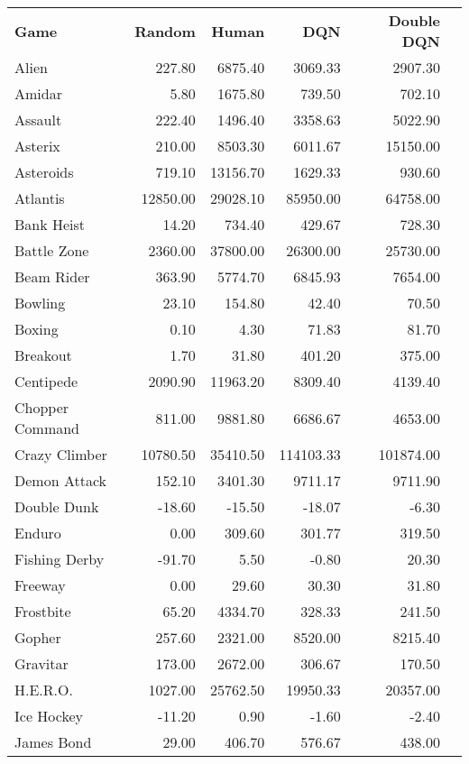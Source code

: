 \documentclass[letterpaper]{article}
\begin{document}
\begin{table*}[h]
\centering
\begin{tabular}{lrrrrr}
\textbf{Game} & \textbf{Random} & \textbf{Human} & \textbf{DQN} & \textbf{Double DQN} \\
Alien & 227.80 & 6875.40 & 3069.33 & 2907.30 \\
Amidar & 5.80 & 1675.80 & 739.50 & 702.10 \\
Assault & 222.40 & 1496.40 & 3358.63 & 5022.90 \\
Asterix & 210.00 & 8503.30 & 6011.67 & 15150.00 \\
Asteroids & 719.10 & 13156.70 & 1629.33 & 930.60 \\
Atlantis & 12850.00 & 29028.10 & 85950.00 & 64758.00 \\
Bank Heist & 14.20 & 734.40 & 429.67 & 728.30 \\
Battle Zone & 2360.00 & 37800.00 & 26300.00 & 25730.00 \\
Beam Rider & 363.90 & 5774.70 & 6845.93 & 7654.00 \\
Bowling & 23.10 & 154.80 & 42.40 & 70.50 \\
Boxing & 0.10 & 4.30 & 71.83 & 81.70 \\
Breakout & 1.70 & 31.80 & 401.20 & 375.00 \\
Centipede & 2090.90 & 11963.20 & 8309.40 & 4139.40 \\
Chopper Command & 811.00 & 9881.80 & 6686.67 & 4653.00 \\
Crazy Climber & 10780.50 & 35410.50 & 114103.33 & 101874.00 \\
Demon Attack & 152.10 & 3401.30 & 9711.17 & 9711.90 \\
Double Dunk & -18.60 & -15.50 & -18.07 & -6.30 \\
Enduro & 0.00 & 309.60 & 301.77 & 319.50 \\
Fishing Derby & -91.70 & 5.50 & -0.80 & 20.30 \\
Freeway & 0.00 & 29.60 & 30.30 & 31.80 \\
Frostbite & 65.20 & 4334.70 & 328.33 & 241.50 \\
Gopher & 257.60 & 2321.00 & 8520.00 & 8215.40 \\
Gravitar & 173.00 & 2672.00 & 306.67 & 170.50 \\
H.E.R.O. & 1027.00 & 25762.50 & 19950.33 & 20357.00 \\
Ice Hockey & -11.20 & 0.90 & -1.60 & -2.40 \\
James Bond & 29.00 & 406.70 & 576.67 & 438.00 \\

\end{tabular}
\end{table*}
\end{document}
